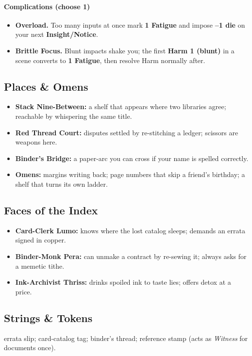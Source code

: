 \documentclass[11pt,letterpaper]{article}
\begin{document}
\paragraph{Complications (choose 1)}
\begin{itemize}
\item \textbf{Overload.} Too many inputs at once mark \textbf{1 Fatigue} and impose \textbf{--1 die} on your next \textbf{Insight/Notice}.
\item \textbf{Brittle Focus.} Blunt impacts shake you; the first \textbf{Harm 1 (blunt)} in a scene converts to \textbf{1 Fatigue}, then resolve Harm normally after.
\end{itemize}

\subsection*{Places \& Omens}
\begin{itemize}
\item \textbf{Stack Nine-Between:} a shelf that appears where two libraries agree; reachable by whispering the same title.
\item \textbf{Red Thread Court:} disputes settled by re-stitching a ledger; scissors are weapons here.
\item \textbf{Binder's Bridge:} a paper-arc you can cross if your name is spelled correctly.
\item \textbf{Omens:} margins writing back; page numbers that skip a friend's birthday; a shelf that turns its own ladder.
\end{itemize}

\subsection*{Faces of the Index}
\begin{itemize}
\item \textbf{Card-Clerk Lumo:} knows where the lost catalog sleeps; demands an errata signed in copper.
\item \textbf{Binder-Monk Pera:} can unmake a contract by re-sewing it; always asks for a memetic tithe.
\item \textbf{Ink-Archivist Thriss:} drinks spoiled ink to taste lies; offers detox at a price.
\end{itemize}

\subsection*{Strings \& Tokens}
errata slip; card-catalog tag; binder's thread; reference stamp (acts as \emph{Witness} for documents once).
\end{document}

